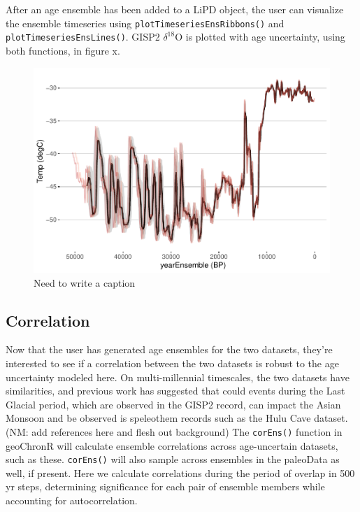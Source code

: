 \documentclass[gc, manuscript]{copernicus}
\begin{document}
After an age ensemble has been added to a LiPD object, the user can visualize the ensemble timeseries using \texttt{plotTimeseriesEnsRibbons()} and \texttt{plotTimeseriesEnsLines()}.
GISP2 \(\delta^{18}\)O is plotted with age uncertainty, using both functions, in figure x.

\begin{figure}
\centering
\includegraphics{geoChronR-paper_files/figure-latex/unnamed-chunk-6-1.pdf}
\caption{\label{fig:unnamed-chunk-6}Need to write a caption}
\end{figure}

\subsection{Correlation}

Now that the user has generated age ensembles for the two datasets, they're interested to see if a correlation between the two datasets is robust to the age uncertainty modeled here.
On multi-millennial timescales, the two datasets have similarities, and previous work has suggested that could events during the Last Glacial period, which are observed in the GISP2 record, can impact the Asian Monsoon and be observed is speleothem records such as the Hulu Cave dataset. (NM: add references here and flesh out background)
The \texttt{corEns()} function in geoChronR will calculate ensemble correlations across age-uncertain datasets, such as these.
\texttt{corEns()} will also sample across ensembles in the paleoData as well, if present.
Here we calculate correlations during the period of overlap in 500 yr steps, determining significance for each pair of ensemble members while accounting for autocorrelation.
\end{document}
